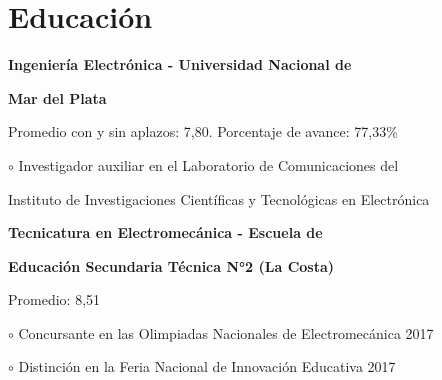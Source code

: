 \documentclass[a4paper,10pt]{article}
\begin{document}
\begin{adjustbox}{valign=t}
\begin{minipage}{0.60\textwidth} %
\section*{Educación}
\begin{description}
\raggedright
\item[ \textcolor{ColorOne}{2018-2023}] 
	\textbf{Ingeniería Electrónica - Universidad Nacional de  } \Myskip
    \item \textbf{Mar del Plata}
    \item Promedio con y sin aplazos: 7,80. Porcentaje de avance: 77,33\%
    \item \textcolor{ColorOne}{$\circ$} Investigador auxiliar en el Laboratorio de Comunicaciones del
    \item \hspace{1}Instituto de Investigaciones Científicas y Tecnológicas en Electrónica \MySkip
 
\item[ \textcolor{ColorOne}{2011-2017}] 
	\textbf{Tecnicatura en Electromecánica - Escuela de } \Myskip
    \item \textbf{Educación Secundaria Técnica N°2 (La Costa)}
    \item Promedio: 8,51
    \item \textcolor{ColorOne}{$\circ$} Concursante en las Olimpiadas Nacionales de Electromecánica 2017
    \item \textcolor{ColorOne}{$\circ$} Distinción en la Feria Nacional de Innovación Educativa 2017

\end{description}

\end{minipage}
\end{adjustbox}
\end{document}
